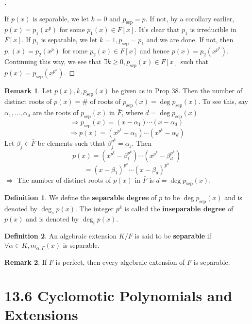 \documentclass{article}
\theoremstyle{definition}
\newtheorem{dfn}{Definition}
\newtheorem{rem}{Remark}
\newenvironment{proofs}[1][\proofname]{%
  \begin{proof}[#1]$ $\par\nobreak\ignorespaces
}{%
  \end{proof}
}
\begin{document}
\begin{proofs}
	If $p(x)$ is separable, we let $k = 0$ and $p_{\text{sep}} = p$.
	If not, by a corollary earlier,  $p(x) = p_1(x^p)$ for some $p_1(x) \in F[x]$.
	It's clear that $p_1$ is irreducible in $F[x]$.
	If $p_1$ is separable, we let $k = 1, p_{\text{sep}} = p_1$ and we are done.
	If not, then $p_1(x) = p_2(x^p)$ for some $p_2(x) \in F[x]$ and hence $p(x) = p_2(x^{p^2})$.
	Continuing this way, we see that $\exists k \geq 0, p_{\text{sep}}(x) \in F[x]$ such that $p(x) = p_{\text{sep}}(x^{p^n})$. 
\end{proofs} 

\begin{rem}
	Let $p(x), k, p_{\text{sep}}(x)$ be given as in Prop 38.
	Then the number of distinct roots of $p(x) = \#$ of roots of $p_{\text{sep}}(x) = \deg p_{\text{sep}}(x)$.
	To see this, say $\alpha_1, ..., \alpha_d$ are the roots of $p_{\text{sep}}(x)$ in $\bar{F}$, where $d = \deg p_{\text{sep}}(x)$ 
	\[
		\Rightarrow p_{\text{sep}}(x) = (x - \alpha_1) \cdots (x - \alpha_d)
	\]
	\[
		\Rightarrow p(x) = (x^{p^k} - \alpha_1) \cdots (x^{p^k} - \alpha_d)
	\]
	Let $\beta_j \in \bar{F}$ be elements such tthat $\beta_j^{p^k} = \alpha_j$.
	Then 
	\[
		p(x) = (x^{p^k} - \beta_1^{p^k}) \cdots (x^{p^k} - \beta_d^{p^k})
	\]
	\[
		= (x - \beta_1)^{p^k} \cdots (x - \beta_d)^{p^k}
	\]
	$\Rightarrow$ The number of distinct roots of $p(x)$ in $\bar{F}$ is $d = \deg p_{\text{sep}}(x)$.
\end{rem}

\begin{dfn}
	We define the \textbf{separable degree} of $p$ to be $\deg p_{\text{sep}}(x)$ and is denoted by $\deg_s p(x)$. 
	The integer $p^k$ is called the \textbf{inseparable degree} of $p(x)$ and is denoted by $\deg_i p(x)$.
\end{dfn}

\begin{dfn}
	An algebraic extension $K/F$ is said to be \textbf{separable} if $\forall \alpha \in K, m_{\alpha, F}(x)$ is separable.
\end{dfn}

\begin{rem}
	If $F$ is perfect, then every algebraic extension of $F$ is separable.
\end{rem}

\section*{13.6 Cyclomotic Polynomials and Extensions}
\end{document}
